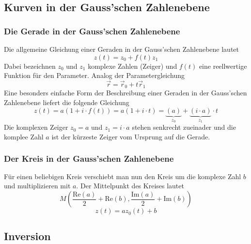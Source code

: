 \subsection{Kurven in der Gauss'schen Zahlenebene}
\subsubsection{Die Gerade in der Gauss'schen Zahlenebene}
Die allgemeine Gleichung einer Geraden in der Gauss'schen Zahlenebene lautet
\begin{equation}
\boxed{z\left(t\right)=z_0+f\left(t\right)z_1}
\end{equation}
Dabei bezeichnen $z_0$ und $z_1$ komplexe Zahlen (Zeiger) und $f\left(t\right)$ eine reellwertige Funktion für den Parameter. Analog der Parametergleichung
\begin{equation}
\boxed{\overrightarrow{r}=\overrightarrow{r}_0+t\overrightarrow{r}_1}
\end{equation}
Eine besonders einfache Form der Beschreibung einer Geraden in der Gauss'schen Zahlenebene liefert die folgende Gleichung
\begin{equation}
\boxed{z\left(t\right)=a\left(1+i\cdot f\left(t\right)\right)=a\left(1+i\cdot t\right)=\underbrace{\left(a\right)}_{z_0}+\underbrace{\left(i\cdot a\right)}_{z_1}\cdot t}
\end{equation}
Die komplexen Zeiger $z_0=a$ und $z_1=i\cdot a$ stehen senkrecht zueinader und die komplee Zahl $a$ ist der kürzeste Zeiger vom Ursprung auf die Gerade.
\subsubsection{Der Kreis in der Gauss'schen Zahlenebene}
Für einen beliebigen Kreis verschiebt man nun den Kreis um die komplexe Zahl $b$ und multiplizieren mit $a$. Der Mittelpunkt des Kreises lautet
\begin{equation}
\boxed{M\left(\dfrac{\text{Re}\left(a\right)}{2}+\text{Re}\left(b\right), \dfrac{\text{Im}\left(a\right)}{2}+\text{Im}\left(b\right)\right)}
\end{equation}
\begin{equation}
\boxed{z\left(t\right)=az_0\left(t\right)+b}
\end{equation}
\subsection{Inversion}

